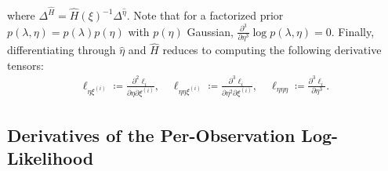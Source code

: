 \documentclass{article}
\begin{document}
%
where $\Delta^{\hat{H}} = \hat{H}(\xi)^{-1} \Delta^{\hat{\eta}}$.
Note that for a factorized prior $p(\lambda, \eta) = p(\lambda) p(\eta)$ with $p(\eta)$ Gaussian, $\frac{\partial^3}{\partial \eta^3} \log p(\lambda, \eta) = 0$.
Finally, differentiating through $\hat{\eta}$ and $\hat{H}$ reduces to computing the following derivative tensors:
%
\begin{align}\label{eq:ell-derivative-tensors}
  \ell_{\eta \xi^{(i)}} \coloneqq \frac{\partial^2 \ell_i}{\partial \eta \partial \xi^{(i)}},
  \quad
  \ell_{\eta \eta \xi^{(i)}} \coloneqq \frac{\partial^3 \ell_i}{\partial \eta^2 \partial \xi^{(i)}},
  \quad
  \ell_{\eta \eta \eta} \coloneqq \frac{\partial^3 \ell_i}{\partial \eta^3}.
\end{align}

\subsection{Derivatives of the Per-Observation Log-Likelihood}
\end{document}
